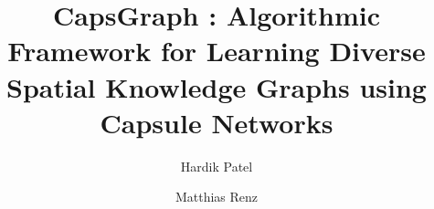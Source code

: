 \documentclass[sigconf]{acmart}
\begin{document}
\title{CapsGraph : Algorithmic Framework for Learning Diverse Spatial Knowledge Graphs using Capsule Networks}

\def\matthias#1{{\sc \textcolor{green}{Matthias says: }}{\marrow\sf \textcolor{red}{#1}}}
\def\pavlos#1{{\sc \textcolor{blue}{Pavlos says: }}{\marrow\sf \textcolor{red}{#1}}}
\def\hardik#1{{\sc \textcolor{red}{Hardik says: }}{\marrow\sf \textcolor{red}{#1}}}


\author{Hardik Patel}



\author{Matthias Renz}







\maketitle


% 



% 
% 


\end{document}
